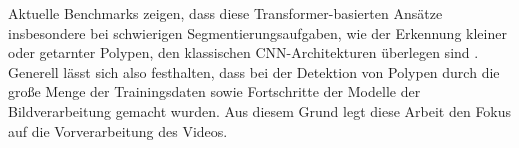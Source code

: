 Aktuelle Benchmarks zeigen, dass diese Transformer-basierten Ansätze insbesondere bei schwierigen Segmentierungsaufgaben, wie der Erkennung kleiner oder getarnter Polypen, den klassischen CNN-Architekturen überlegen sind \cite{wang2022stepwise}. 
\\
Generell lässt sich also festhalten, dass bei der Detektion von Polypen durch die große Menge der Trainingsdaten sowie Fortschritte der Modelle der Bildverarbeitung gemacht wurden. Aus diesem Grund legt diese Arbeit den Fokus auf die Vorverarbeitung des Videos.